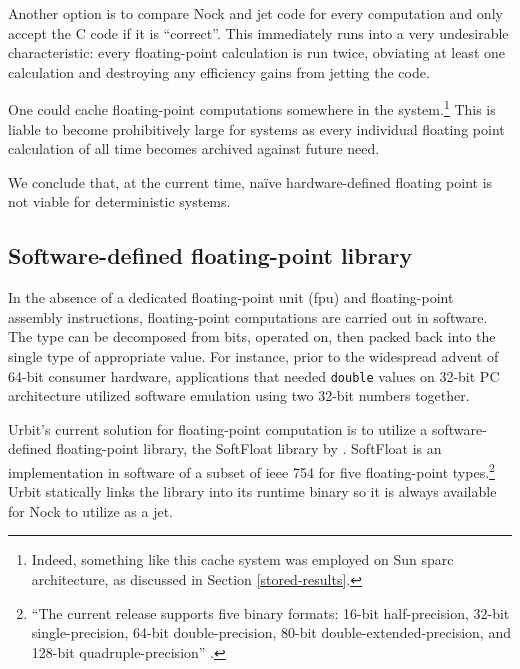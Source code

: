 \documentclass[twoside]{article}
\begin{document}
Another option is to compare Nock and jet code for every computation and only accept the C code if it is “correct”.  This immediately runs into a very undesirable characteristic:  every floating-point calculation is run twice, obviating at least one calculation and destroying any efficiency gains from jetting the code.

One could cache floating-point computations somewhere in the system.\footnote{Indeed, something like this cache system was employed on Sun {\sc sparc} architecture, as discussed in Section \ref{stored-results}.}  This is liable to become prohibitively large for systems as every individual floating point calculation of all time becomes archived against future need.

We conclude that, at the current time, naïve hardware-defined floating point is not viable for deterministic systems.

\subsection{Software-defined floating-point library}

In the absence of a dedicated floating-point unit ({\sc fpu}) and floating-point assembly instructions, floating-point computations are carried out in software.  The type can be decomposed from bits, operated on, then packed back into the single type of appropriate value.  For instance, prior to the widespread advent of 64-bit consumer hardware, applications that needed \texttt{double} values on 32-bit PC architecture utilized software emulation using two 32-bit numbers together.

Urbit's current solution for floating-point computation is to utilize a software-defined floating-point library, the SoftFloat library by \citeauthor{Hauser2018}.  SoftFloat is an implementation in software of a subset of {\sc ieee} 754 for five floating-point types.\footnote{“The current release supports five binary formats: 16-bit half-precision, 32-bit single-precision, 64-bit double-precision, 80-bit double-extended-precision, and 128-bit quadruple-precision” \citep{Hauser2018}.}  Urbit statically links the library into its runtime binary so it is always available for Nock to utilize as a jet.
\end{document}
